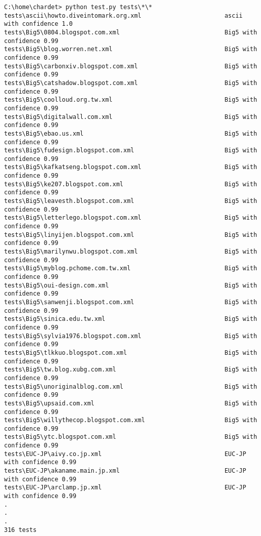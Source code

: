 \begin{lstlisting}[breaklines=true]
C:\home\chardet> python test.py tests\*\*
tests\ascii\howto.diveintomark.org.xml                       ascii with confidence 1.0
tests\Big5\0804.blogspot.com.xml                             Big5 with confidence 0.99
tests\Big5\blog.worren.net.xml                               Big5 with confidence 0.99
tests\Big5\carbonxiv.blogspot.com.xml                        Big5 with confidence 0.99
tests\Big5\catshadow.blogspot.com.xml                        Big5 with confidence 0.99
tests\Big5\coolloud.org.tw.xml                               Big5 with confidence 0.99
tests\Big5\digitalwall.com.xml                               Big5 with confidence 0.99
tests\Big5\ebao.us.xml                                       Big5 with confidence 0.99
tests\Big5\fudesign.blogspot.com.xml                         Big5 with confidence 0.99
tests\Big5\kafkatseng.blogspot.com.xml                       Big5 with confidence 0.99
tests\Big5\ke207.blogspot.com.xml                            Big5 with confidence 0.99
tests\Big5\leavesth.blogspot.com.xml                         Big5 with confidence 0.99
tests\Big5\letterlego.blogspot.com.xml                       Big5 with confidence 0.99
tests\Big5\linyijen.blogspot.com.xml                         Big5 with confidence 0.99
tests\Big5\marilynwu.blogspot.com.xml                        Big5 with confidence 0.99
tests\Big5\myblog.pchome.com.tw.xml                          Big5 with confidence 0.99
tests\Big5\oui-design.com.xml                                Big5 with confidence 0.99
tests\Big5\sanwenji.blogspot.com.xml                         Big5 with confidence 0.99
tests\Big5\sinica.edu.tw.xml                                 Big5 with confidence 0.99
tests\Big5\sylvia1976.blogspot.com.xml                       Big5 with confidence 0.99
tests\Big5\tlkkuo.blogspot.com.xml                           Big5 with confidence 0.99
tests\Big5\tw.blog.xubg.com.xml                              Big5 with confidence 0.99
tests\Big5\unoriginalblog.com.xml                            Big5 with confidence 0.99
tests\Big5\upsaid.com.xml                                    Big5 with confidence 0.99
tests\Big5\willythecop.blogspot.com.xml                      Big5 with confidence 0.99
tests\Big5\ytc.blogspot.com.xml                              Big5 with confidence 0.99
tests\EUC-JP\aivy.co.jp.xml                                  EUC-JP with confidence 0.99
tests\EUC-JP\akaname.main.jp.xml                             EUC-JP with confidence 0.99
tests\EUC-JP\arclamp.jp.xml                                  EUC-JP with confidence 0.99
.
.
.
316 tests
\end{lstlisting}

